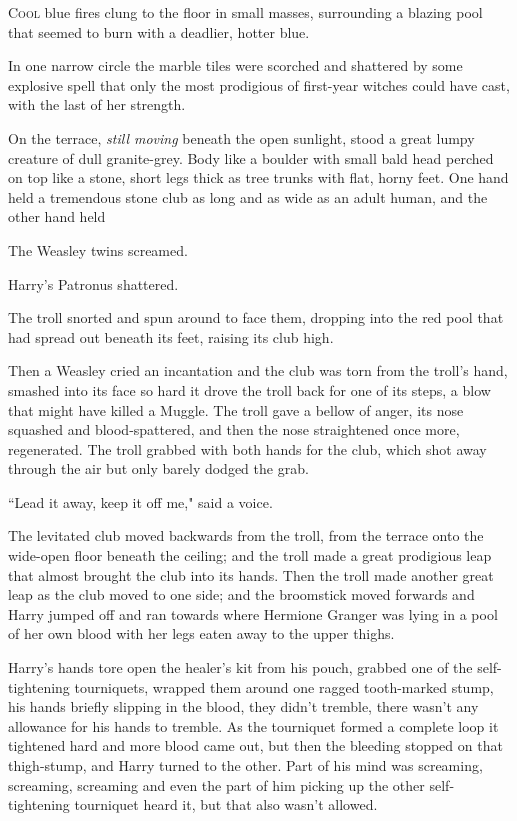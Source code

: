 
\lettrine{C}{ool} blue fires clung to the floor in small masses, surrounding a blazing pool that seemed to burn with a deadlier, hotter blue.

In one narrow circle the marble tiles were scorched and shattered by some explosive spell that only the most prodigious of first-year witches could have cast, with the last of her strength.

On the terrace, \emph{still moving} beneath the open sunlight, stood a great lumpy creature of dull granite-grey. Body like a boulder with small bald head perched on top like a stone, short legs thick as tree trunks with flat, horny feet. One hand held a tremendous stone club as long and as wide as an adult human, and the other hand held 

The Weasley twins screamed.

Harry's Patronus shattered.

The troll snorted and spun around to face them, dropping  into the red pool that had spread out beneath its feet, raising its club high.

Then a Weasley cried an incantation and the club was torn from the troll's hand, smashed into its face so hard it drove the troll back for one of its steps, a blow that might have killed a Muggle. The troll gave a bellow of anger, its nose squashed and blood-spattered, and then the nose straightened once more, regenerated. The troll grabbed with both hands for the club, which shot away through the air but only barely dodged the grab.

``Lead it away, keep it off me," said a voice.

The levitated club moved backwards from the troll, from the terrace onto the wide-open floor beneath the ceiling; and the troll made a great prodigious leap that almost brought the club into its hands. Then the troll made another great leap as the club moved to one side; and the broomstick moved forwards and Harry jumped off and ran towards where Hermione Granger was lying in a pool of her own blood with her legs eaten away to the upper thighs.

Harry's hands tore open the healer's kit from his pouch, grabbed one of the self-tightening tourniquets, wrapped them around one ragged tooth-marked stump, his hands briefly slipping in the blood, they didn't tremble, there wasn't any allowance for his hands to tremble. As the tourniquet formed a complete loop it tightened hard and more blood came out, but then the bleeding stopped on that thigh-stump, and Harry turned to the other. Part of his mind was screaming, screaming, screaming and even the part of him picking up the other self-tightening tourniquet heard it, but that also wasn't allowed.

